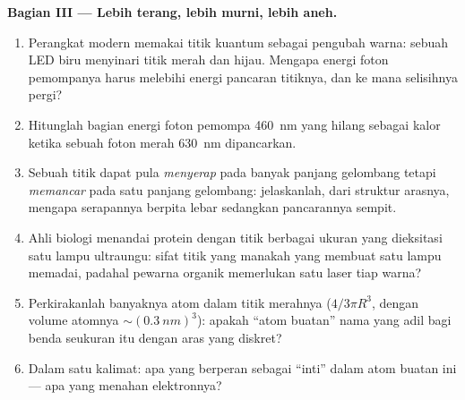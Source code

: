 \begin{problem}
\medskip\noindent\textbf{Bagian III --- Lebih terang, lebih murni, lebih aneh.}
\begin{enumerate}[resume]
  \item Perangkat modern memakai titik kuantum sebagai pengubah warna:
        sebuah LED biru menyinari titik merah dan hijau. Mengapa energi
        foton pemompanya harus melebihi energi pancaran titiknya, dan ke
        mana selisihnya pergi?
  \item Hitunglah bagian energi foton pemompa \qty{460}{nm} yang hilang
        sebagai kalor ketika sebuah foton merah \qty{630}{nm}
        dipancarkan.
  \item Sebuah titik dapat pula \emph{menyerap} pada banyak panjang
        gelombang tetapi \emph{memancar} pada satu panjang gelombang:
        jelaskanlah, dari struktur arasnya, mengapa serapannya berpita
        lebar sedangkan pancarannya sempit.
  \item Ahli biologi menandai protein dengan titik berbagai ukuran yang
        dieksitasi satu lampu ultraungu: sifat titik yang manakah yang
        membuat satu lampu memadai, padahal pewarna organik memerlukan
        satu laser tiap warna?
  \item Perkirakanlah banyaknya atom dalam titik merahnya ($4/3\pi R^3$,
        dengan volume atomnya $\sim(\qty{0.3}{nm})^3$): apakah ``atom
        buatan'' nama yang adil bagi benda seukuran itu dengan aras yang
        diskret?
  \item Dalam satu kalimat: apa yang berperan sebagai ``inti'' dalam
        atom buatan ini --- apa yang menahan elektronnya?
\end{enumerate}


\end{problem}
